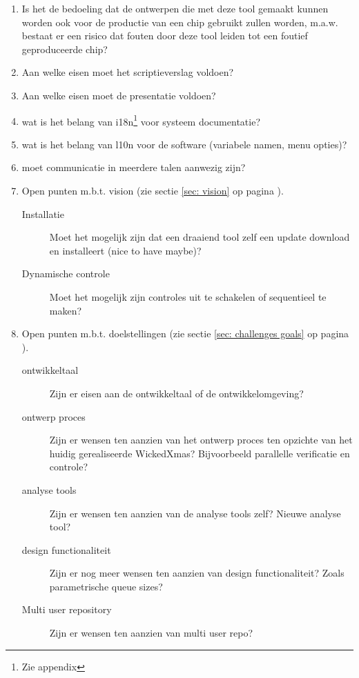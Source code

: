 \documentclass[a4paper,11pt]{article}
\begin{document}
\begin{enumerate}
 \item Is het de bedoeling dat de ontwerpen die met deze tool gemaakt kunnen worden ook voor de productie van een
 chip gebruikt zullen worden, m.a.w. bestaat er een risico dat fouten door deze tool leiden tot een
 foutief geproduceerde chip?
 \item Aan welke eisen moet het scriptieverslag voldoen?
 \item Aan welke eisen moet de presentatie voldoen?
 \item wat is het belang van i18n\footnote{Zie appendix} voor systeem documentatie?
 \item wat is het belang van l10n voor de software (variabele namen, menu opties)?
 \item moet communicatie in meerdere talen aanwezig zijn?

 \item Open punten m.b.t. vision (zie sectie \ref{sec: vision} op pagina \pageref{sec: vision}).
 \begin{description}
  \item[Installatie] Moet het mogelijk zijn dat een draaiend tool zelf een update download en installeert (nice to have maybe)?
  \item[Dynamische controle] Moet het mogelijk zijn controles uit te schakelen of sequentieel te maken?
 \end{description}

 \item Open punten m.b.t. doelstellingen (zie sectie \ref{sec: challenges goals} op pagina \pageref{sec: challenges goals}).
 \begin{description}
    \item[ontwikkeltaal] Zijn er eisen aan de ontwikkeltaal of de ontwikkelomgeving?
    \item[ontwerp proces] Zijn er wensen ten aanzien van het ontwerp proces ten opzichte van het
	huidig gerealiseerde WickedXmas? Bijvoorbeeld parallelle verificatie en controle?
    \item[analyse tools] Zijn er wensen ten aanzien van de analyse tools zelf? Nieuwe analyse tool?
    \item[design functionaliteit] Zijn er nog meer wensen ten aanzien van design functionaliteit? Zoals parametrische queue sizes?
    \item[Multi user repository] Zijn er wensen ten aanzien van multi user repo?
 \end{description}
\end{enumerate}
\end{document}
